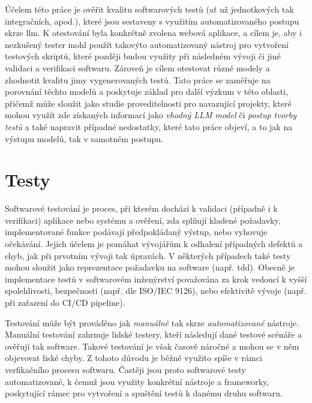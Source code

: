 \documentclass[czech, ma, kiv, he, iso690numb, pdf, viewonly]{fasthesis}
\begin{document}
    Účelem této práce je ověřit kvalitu softwarových testů (ať už jednotkových tak integračních, apod.), které jsou sestaveny s využitím automatizovaného postupu skrze \Gls{llm}. K otestování byla konkrétně zvolena webová aplikace, a cílem je, aby i nezkušený tester mohl použít takovýto automatizovaný nástroj pro vytvoření testových skriptů, které později budou využity při následném vývoji či jiné validaci a verifikaci softwaru. Zároveň je cílem otestovat různé modely a zhodnotit kvalitu jimy vygenerovaných testů. Tato práce se zaměřuje na porovnání těchto modelů a poskytuje základ pro další výzkum v této oblasti, přičemž může sloužit jako studie proveditelnosti pro navazující projekty, které mohou využít zde získaných informací jako \textit{vhodný LLM model} či \textit{postup tvorby testů} a také napravit případné nedostatky, které tato práce objeví, a to jak na výstupu modelů, tak v samotném postupu.
    
    \section{Testy}

    Softwarové testování je proces, při kterém dochází k validaci (případně i k verifikaci) aplikace nebo systému a ověření, zda splňují kladené požadavky, implementované funkce podávají předpokládaný výstup, nebo vyhovuje očekávání. Jejich účelem je pomáhat vývojářům k odhalení případných defektů a chyb, jak při prvotním vývoji tak úpravách. V některých případech také testy mohou sloužit jako reprezentace požadavku na software (např. \Acrshort{tdd}). Obecně je implementace testů v softwarovém inženýrství považována za krok vedoucí k vyšší spolehlivosti, bezpečnosti (např. dle ISO/IEC 9126), nebo efektivitě vývoje (např. při zařazení do CI/CD pipeline).

    Testování může být prováděno jak \textit{manuálně} tak skrze \textit{automatizované} nástroje. Manuální testování zahrnuje lidské testery, kteří následují dané testové scénáře a ověřují tak software. Takové testování je však časově náročné a mohou se v něm objevovat liské chyby. Z tohoto důvodu je běžně využito spíše v rámci verfikačního procesu softwaru. Častěji jsou proto softwarové testy automatizované, k čemuž jsou využity konkrétní nástroje a frameworky, poskytující rámec pro vytvoření a spuštění testů k danému druhu softwaru. \cite{geeksforgeeks2023testingtypes}
\end{document}
